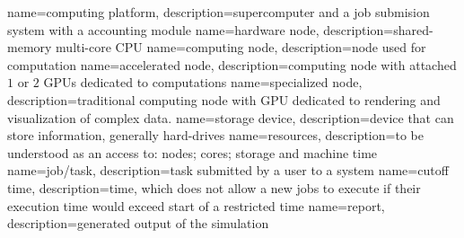 

{
	name={computing platform},
	description={supercomputer and a job submision system with a accounting module}
}
{
	name={hardware node},
	description={shared-memory multi-core CPU}
}
{
	name={computing node},
	description={node used for computation}
}
{
	name={accelerated node},
	description={computing node with attached $1$ or $2$ GPUs dedicated to computations}
}
{
	name={specialized node},
	description={traditional computing node with GPU dedicated to rendering and visualization of complex data.}
}
{
	name={storage device},
	description={device that can store information, generally hard-drives}
}
{
	name={resources},
	description={to be understood as an access to: nodes; cores; storage and machine time}
}
{
	name={job/task},
	description={task submitted by a user to a system}
}
{
	name={cutoff time},
	description={time, which does not allow a new jobs to execute if their execution time would exceed start of a restricted time}
}
{
	name={report},
	description={generated output of the simulation}
}
